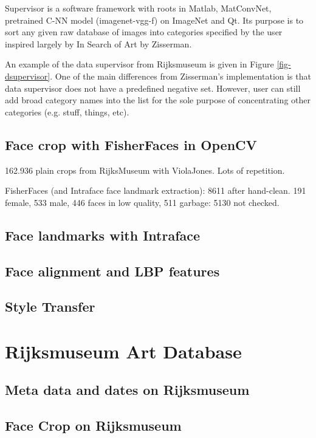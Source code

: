 \documentclass[runningheads]{llncs}
\begin{document}
Supervisor is a software framework with roots in Matlab\cite{MATLAB:2014}, MatConvNet\cite{matconvnet}, pretrained C-NN model\cite{Chatfield14} (imagenet-vgg-f) on ImageNet\cite{ILSVRC15} and Qt. Its purpose is to sort any given raw database of images into categories specified by the user inspired largely by In Search of Art by Zisserman\cite{Crowley14a}.

An example of the data supervisor from Rijksmuseum\cite{rijksmuseum1976tot} is given in Figure \ref{fig-dsupervisor}. One of the main differences from Zisserman's\cite{Crowley14a} implementation is that data supervisor does not have a predefined negative set. However, user can still add broad category names into the list for the sole purpose of concentrating other categories (e.g. stuff, things, etc).


\subsection{Face crop with FisherFaces in OpenCV}
162.936 plain crops from RijksMuseum\cite{rijksmuseum1976tot} with ViolaJones. Lots of repetition. 

FisherFaces (and Intraface face landmark extraction): 8611 after hand-clean. 191 female, 533 male, 446 faces in low quality, 511 garbage: 5130 not checked.
\subsection{Face landmarks with Intraface}

\subsection{Face alignment and LBP features}

\subsection{Style Transfer}

\section{Rijksmuseum Art Database}
\subsection{Meta data and dates on Rijksmuseum}

\subsection{Face Crop on Rijksmuseum}
\end{document}
